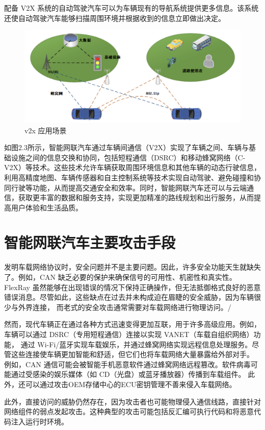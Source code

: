 配备 V2X 系统的自动驾驶汽车可以为车辆现有的导航系统提供更多信息。该系统还使自动驾驶汽车能够扫描周围环境并根据收到的信息立即做出决定。
\begin{figure}
    \centering
    \includegraphics[scale=0.6]{resources/img/i3.png}
    \caption{v2x 应用场景}
  \end{figure}
如图2.3所示，智能网联汽车通过车辆间通信（V2X）实现了车辆之间、车辆与基础设施之间的信息交换和协同，包括短程通信（DSRC）和移动蜂窝网络（C-V2X）等技术。这些技术允许车辆获取周围环境信息和其他车辆的动态行驶信息，利用高精度地图、车辆传感器和自主控制系统等技术实现自动驾驶、避免碰撞和协同行驶等功能，从而提高交通安全和效率。同时，智能网联汽车还可以与云端通信，获取更丰富的数据和服务支持，实现更加精准的路线规划和出行服务，从而提高用户体验和生活品质。
\section{智能网联汽车主要攻击手段}
发明车载网络协议时，安全问题并不是主要问题。因此，许多安全功能天生就缺失了。例如，CAN 缺乏必要的保护来确保信号的可用性、机密性和真实性\cite{woo2014practical}。
FlexRay 虽然能够在出现错误的情况下保持正确操作，但无法抵御格式良好的恶意错误消息\cite{kleberger2011security}。尽管如此，这些缺点在过去并未构成迫在眉睫的安全威胁，因为车辆很少与外界连接，
而老式的安全攻击通常需要对车载网络进行物理访问。/

然而，现代车辆正在通过各种方式迅速变得更加互联，用于许多高级应用。例如，车辆可以通过 DSRC（专用短程通信）连接以实现 VANET（车载自组织网络）功能，
通过 Wi-Fi/蓝牙实现车载娱乐，并通过蜂窝网络实现远程信息处理服务。尽管这些连接使车辆更加智能和舒适，但它们也将车载网络大量暴露给外部对手。
例如，CAN 通信可能会被智能手机恶意软件通过蜂窝网络远程篡改\cite{woo2014practical}。软件病毒可能通过受感染的娱乐媒体（如 CD（光盘）或蓝牙播放器）传播到车载组件。
此外，还可以通过攻击OEM存储中心的ECU密钥管理不善来侵入车载网络。

此外，直接访问的威胁仍然存在，因为攻击者也可能物理侵入通信线路，直接针对网络组件的弱点发起攻击。这种典型的攻击可能包括反汇编可执行代码和将恶意代码注入运行时环境。

